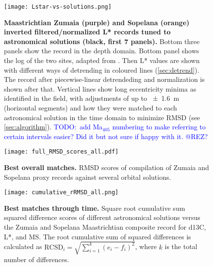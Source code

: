 \documentclass[draft]{agujournal2019}
\newcommand{\ma}[1]{Ma\(_{405}\)#1} %
\newcommand{\ijk}{\textcolor{blue}}
\begin{document}
\begin{figure}[htb]
  \centering
  \texttt{[image: Lstar-vs-solutions.png]}
  \caption{\label{fig:rolling-depth-age}
    \textbf{Maastrichtian Zumaia (purple) and Sopelana (orange) inverted filtered/normalized \gls{L*} records tuned to astronomical solutions (black, first 7 panels).}
    Bottom three panels show the record in the depth domain.
    Bottom panel shows the log of the two sites, adapted from .
    Then \gls{L*} values are shown with different ways of detrending in coloured lines (\cref{sec:detrend}).
    The record after piecewise-linear detrendeding and normalization is shown after that.
    Vertical lines show long eccentricity minima as identified in the field,
    with adjustments of up to \qty{\pm1.6}{\metre} (horizontal segments)
    and how they were matched to each astronomical solution in the time domain to minimize \gls{RMSD} (see \cref{sec:algorithm}).
    \ijk{TODO:\ add \ma{} numbering to make referring to certain intervals easier? Did it but not sure if happy with it. @REZ?}
    }
\end{figure}


\begin{figure}[htb]
    \centering
    \texttt{[image: full\_RMSD\_scores\_all.pdf]}
    \caption{\label{fig:full-RMSD-all} %
      \textbf{Best overall matches.}
        \gls{RMSD} scores of compilation of Zumaia and Sopelana proxy records against several orbital solutions.
    }
\end{figure}

\begin{figure}[htb]
  \centering
  \texttt{[image: cumulative\_rRMSD\_all.png]}
  \caption{\label{fig:cum-RMSD-all}
    \textbf{Best matches through time.}
    Square root cumulative sum squared difference scores of
    different astronomical solutions versus the Zumaia and Sopelana Maastrichtian composite record
    for \gls{d13C}, \gls{L*}, and \gls{MS}.
    The root cumulative sum of squared differences is calculated as \(\text{RCSD}_{i} = \sqrt{\sum_{i=1}^{k}(e_{i} - f_{i})^{2}}\), where \(k\) is the total number of differences.
  }
\end{figure}
\end{document}
